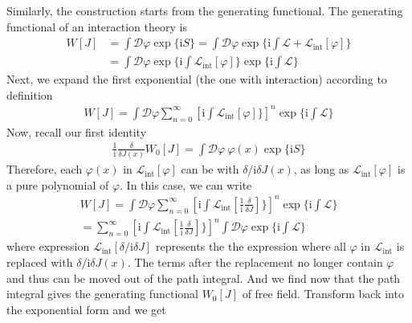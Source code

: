 \documentclass[letterpaper,10pt,english]{sphinxmanual}
\begin{document}
Similarly, the construction starts from the generating functional. The generating functional of an interaction theory is
\begin{equation*}
\begin{split}W[J] &= \int\mathcal{D}\varphi\exp\{\mathrm iS\} = \int\mathcal{D}\varphi\exp\{\mathrm i\!\!\int\!\!\mathcal{L}\! + \!\mathcal{L}_{\text{int}}[\varphi]\}\\
&= \int\mathcal{D}\varphi\exp\{\mathrm i\!\!\int\!\!\mathcal{L}_{\text{int}}[\varphi]\}\exp\{\mathrm i\!\!\int\!\!\mathcal{L}\}\end{split}
\end{equation*}
Next, we expand the first exponential (the one with interaction) according to definition
\begin{equation*}
\begin{split}W[J] = \int\mathcal{D}\varphi\sum_{n=0}^\infty\left[\mathrm i\!\!\int\!\!\mathcal{L}_{\text{int}}[\varphi]\}\right]^n\exp\{\mathrm i\!\!\int\!\!\mathcal{L}\}\end{split}
\end{equation*}
Now, recall our first identity
\begin{equation*}
\begin{split}\frac{1}{\mathrm{i}}\frac{\delta}{\delta J(x)}W_0[J] = \int\mathcal{D}\varphi\ \varphi(x)\exp\{\mathrm{i}S\}\end{split}
\end{equation*}
Therefore, each \(\varphi(x)\) in \(\mathcal{L}_{\text{int}}[\varphi]\) can be  with \(\delta/\mathrm{i}\delta J(x)\), as long as \(\mathcal{L}_{\text{int}}[\varphi]\) is a pure polynomial of \(\varphi\). In this case, we can write
\begin{equation*}
\begin{split}W[J] = \int\mathcal{D}\varphi\sum_{n=0}^\infty\left[\mathrm i\!\!\int\!\!\mathcal{L}_{\text{int}}\!\!\left[\frac{1}{\mathrm{i}}\!\frac{\delta}{\delta J}\right]\}\right]^n\exp\{\mathrm i\!\!\int\!\!\mathcal{L}\}\\
= \sum_{n=0}^\infty\left[\mathrm i\!\!\int\!\!\mathcal{L}_{\text{int}}\!\!\left[\frac{1}{\mathrm{i}}\!\frac{\delta}{\delta J}\right]\}\right]^n\int\mathcal{D}\varphi\exp\{\mathrm i\!\!\int\!\!\mathcal{L}\}\end{split}
\end{equation*}
where expression \(\mathcal{L}_{\text{int}}\!\!\left[\delta/\mathrm{i}\delta J\right]\) represents the the expression where all \(\varphi\) in \(\mathcal{L}_{\text{int}}\) is replaced with \(\delta/\mathrm{i}\delta J(x)\). The terms after the replacement no longer contain \(\varphi\) and thus can be moved out of the path integral. And we find now that the path integral gives the generating functional \(W_0[J]\) of free field. Transform back into the exponential form and we get
\end{document}
